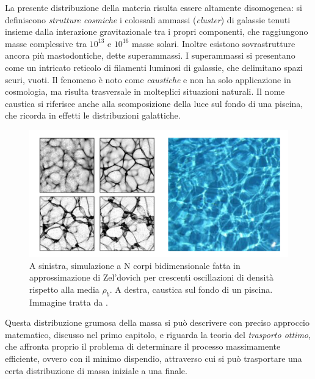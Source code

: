 La presente distribuzione della materia risulta essere altamente disomogenea: si definiscono 
\textit{strutture cosmiche} i colossali ammassi (\textit{cluster}) di galassie tenuti insieme dalla
interazione gravitazionale tra i propri componenti, che raggiungono masse complessive tra $10^{13}$
e $10^{16}$ masse solari. Inoltre esistono sovrastrutture ancora più mastodontiche, dette superammassi.
I superammassi si presentano come un intricato reticolo di filamenti luminosi di galassie, che delimitano
spazi scuri, vuoti. Il fenomeno è noto come \textit{caustiche} e non ha solo applicazione in cosmologia, ma 
risulta trasversale in molteplici situazioni naturali. Il nome caustica si riferisce anche alla scomposizione
della luce sul fondo di una piscina, che ricorda in effetti le distribuzioni galattiche.

\begin{center}
	\begin{figure}[H]
		\centering
		\includegraphics[scale=0.3, angle=0]{caustica.png}
        \caption{A sinistra, simulazione a N corpi bidimensionale fatta in approssimazione di Zel'dovich per crescenti
        oscillazioni di densità rispetto alla media $\rho_b$. A destra, caustica sul fondo di un piscina. Immagine tratta da \cite{gurbatov}.}
		\label{fig:caustica}
	\end{figure}
\end{center}

Questa distribuzione grumosa della massa si può descrivere con preciso approccio matematico, discusso nel primo capitolo,
e riguarda la teoria del \textit{trasporto ottimo}, che affronta proprio il problema di determinare il processo massimamente
efficiente, ovvero con il minimo dispendio, attraverso cui si può trasportare una certa distribuzione di massa iniziale a una 
finale.

